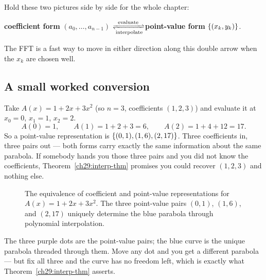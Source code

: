 \begin{focusbox}
Hold these two pictures side by side for the whole chapter:

\textbf{coefficient form} $(a_0,\dots,a_{n-1})$ \quad$\xrightleftharpoons[\text{interpolate}]{\text{evaluate}}$\quad \textbf{point-value form} $\{(x_k,y_k)\}$.

The FFT is a fast way to move in either direction along this
double arrow when the $x_k$ are chosen well.
\end{focusbox}

\subsection{A small worked conversion}

Take $A(x) = 1 + 2x + 3x^2$ (so $n=3$, coefficients $(1,2,3)$) and evaluate it at
$x_0=0$, $x_1=1$, $x_2=2$.
\[
A(0) = 1,\qquad
A(1) = 1+2+3 = 6,\qquad
A(2) = 1+4+12 = 17.
\]
So a point-value representation is $\{(0,1),(1,6),(2,17)\}$. Three coefficients in,
three pairs out --- both forms carry exactly the same information about the same
parabola. If somebody hands you those three pairs and you did not know the
coefficients, Theorem~\ref{ch29:interp-thm} promises you could recover $(1,2,3)$ and
nothing else.

\begin{figure}[H]
\centering
{}
\caption{The equivalence of coefficient and point-value representations for
$A(x) = 1 + 2x + 3x^2$. The three point-value pairs $(0,1)$, $(1,6)$, and
$(2,17)$ uniquely determine the blue parabola through polynomial interpolation.}
\label{ch29:fig-interp}
\end{figure}

The three purple dots are the point-value pairs; the blue curve is the unique
parabola threaded through them. Move any dot and you get a different parabola ---
but fix all three and the curve has no freedom left, which is exactly what
Theorem~\ref{ch29:interp-thm} asserts.

